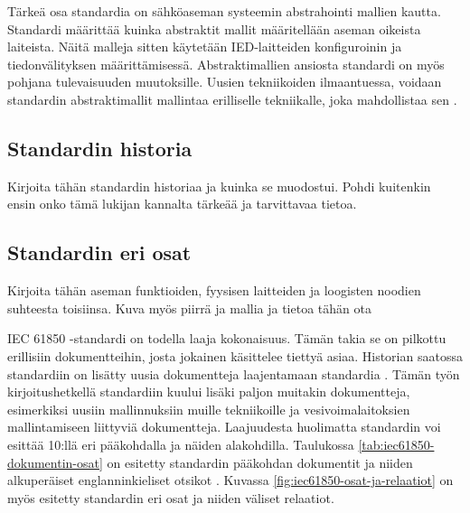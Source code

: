 Tärkeä osa standardia on sähköaseman systeemin abstrahointi mallien kautta. Standardi määrittää kuinka abstraktit mallit määritellään aseman oikeista laiteista. Näitä malleja sitten käytetään IED-laitteiden konfiguroinin ja tiedonvälityksen määrittämisessä. Abstraktimallien ansiosta standardi on myös pohjana tulevaisuuden muutoksille. Uusien tekniikoiden ilmaantuessa, voidaan standardin abstraktimallit mallintaa erilliselle tekniikalle, joka mahdollistaa sen \cite[s.~2]{Brunner2008}.

\subsection{Standardin historia}
\begin{it}
	Kirjoita tähän standardin historiaa ja kuinka se muodostui. Pohdi kuitenkin ensin onko tämä lukijan kannalta tärkeää ja tarvittavaa tietoa.
\end{it}

\subsection{Standardin eri osat}

\begin{it}
	Kirjoita tähän aseman funktioiden, fyysisen laitteiden ja loogisten noodien suhteesta toisiinsa. Kuva myös piirrä ja mallia ja tietoa tähän ota \cite[s.~19]{IEC61850-1}
\end{it}
	
IEC 61850 -standardi on todella laaja kokonaisuus. Tämän takia se on pilkottu erillisiin dokumentteihin, josta jokainen käsittelee tiettyä asiaa. Historian saatossa standardiin on lisätty uusia dokumentteja laajentamaan standardia \cite{IEC61850series, New-documents-by-IEC-TC-57}. Tämän työn kirjoitushetkellä standardiin kuului lisäki paljon muitakin dokumentteja, esimerkiksi uusiin mallinnuksiin muille tekniikoille ja vesivoimalaitoksien mallintamiseen liittyviä dokumentteja. Laajuudesta huolimatta standardin voi esittää 10:llä eri pääkohdalla ja näiden alakohdilla. Taulukossa \ref{tab:iec61850-dokumentin-osat} on esitetty standardin pääkohdan dokumentit ja niiden alkuperäiset englanninkieliset otsikot \cite[s.~2]{Mackiewicz2006} \cite{IEC61850series}. Kuvassa \ref{fig:iec61850-osat-ja-relaatiot} on myös esitetty standardin eri osat ja niiden väliset relaatiot.

